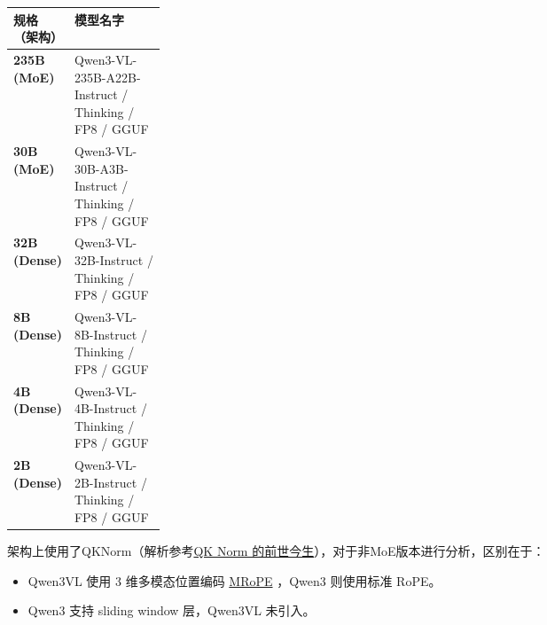 \documentclass[zihao=false,fontset=windows]{ctexart}
\begin{document}
\begin{center}\begin{tabularx}{\linewidth}{|p{0.2\linewidth}|X|}\hline
\rowcolor{tableHead} 规格（架构）\par
 & 模型名字\par
 \\ \hline
\textbf{235B (MoE)}\par
 & Qwen3-VL-235B-A22B-Instruct / Thinking / FP8 / GGUF\par
 \\ \hline
\textbf{30B (MoE)}\par
 & Qwen3-VL-30B-A3B-Instruct / Thinking / FP8 / GGUF\par
 \\ \hline
\textbf{32B (Dense)}\par
 & Qwen3-VL-32B-Instruct / Thinking / FP8 / GGUF\par
 \\ \hline
\textbf{8B (Dense)}\par
 & Qwen3-VL-8B-Instruct / Thinking / FP8 / GGUF\par
 \\ \hline
\textbf{4B (Dense)}\par
 & Qwen3-VL-4B-Instruct / Thinking / FP8 / GGUF\par
 \\ \hline
\textbf{2B (Dense)}\par
 & Qwen3-VL-2B-Instruct / Thinking / FP8 / GGUF\par
 \\ \hline
\end{tabularx}\end{center}

架构上使用了QKNorm（解析参考\href{https://swfvqxo30ma.feishu.cn/wiki/V2c5wrPboiCKJNkN5UocxvpLnTe?from=from_copylink}{QK Norm 的前世今生}），对于非MoE版本进行分析，区别在于：\par

\begin{itemize}[label=\textcolor{feishuBlue}{\textbullet}]
\item Qwen3VL 使用 3 维多模态位置编码 \href{https://scnajei2ds6y.feishu.cn/wiki/JboKw8o8UiaUQbk1CBDckrtFn3f}{MRoPE} ，Qwen3 则使用标准 RoPE。

\end{itemize}

\begin{itemize}[label=\textcolor{feishuBlue}{\textbullet}]
\item Qwen3 支持 sliding window 层，Qwen3VL 未引入。

\end{itemize}
\end{document}
